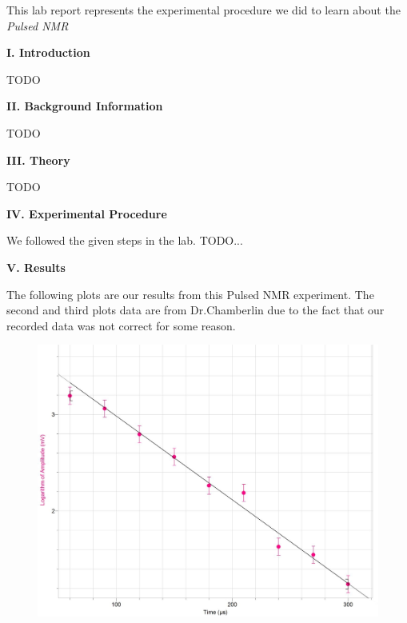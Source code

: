 \documentclass[fleqn]{article}
\begin{document}
  \vspace{10px}

  This lab report represents the experimental procedure we did to learn about the \emph{Pulsed NMR} \textcite{One}

  \vspace{20px}


  \textbf{I. Introduction}

  \vspace{10px}

  TODO 

  \vspace{20px}


  \textbf{II. Background Information}

  \vspace{10px}

  TODO 

  \vspace{20px}


  \textbf{III. Theory}

  \vspace{10px}

  TODO 

  \vspace{20px}


  \textbf{IV. Experimental Procedure}

  \vspace{10px}

  We followed the given steps in the lab. TODO...
  
  \vspace{20px}

  \textbf{V. Results}

  \vspace{10px}

  The following plots are our results from this Pulsed NMR experiment. The second and third plots data are from Dr.Chamberlin due to the fact that our recorded data 
  was not correct for some reason.

  \pagebreak

  \includegraphics[height=9cm, width=14cm]{Fig1.JPG}
  
\end{document}
